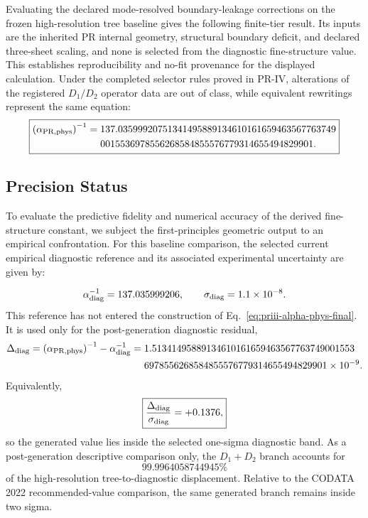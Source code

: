 \documentclass[11pt]{article}
\begin{document}
Evaluating the declared mode-resolved boundary-leakage corrections on the
frozen high-resolution tree baseline gives the following finite-tier result. Its inputs are the inherited PR internal geometry, structural boundary deficit, and declared three-sheet scaling, and none is selected from the diagnostic fine-structure value.  This establishes reproducibility and no-fit provenance for the displayed calculation.  Under the completed selector rules proved in PR-IV, alterations of the registered $D_1/D_2$ operator data are out of class, while equivalent rewritings represent the same equation:
\begin{equation}
\boxed{
\begin{split}
\left(\alpha_{\rm PR,phys}\right)^{-1} = {} & 137.03599920751341495889134610161659463567763749 \\
& 0015536978556268584855576779314655494829901.
\label{eq:priii-alpha-phys-final}
\end{split}}
\end{equation}

\subsection{Precision Status}
\label{subsec:priii-alpha-precision-status}
To evaluate the predictive fidelity and numerical accuracy of the derived fine-structure constant, we subject the first-principles geometric output to an empirical confrontation. For this baseline comparison, the selected current empirical diagnostic reference and its associated experimental uncertainty are given by:

\begin{equation}
\alpha_{\rm diag}^{-1}=137.035999206,
\qquad
\sigma_{\rm diag}=1.1\times 10^{-8}.
\end{equation}
This reference has not entered the construction of Eq.~\eqref{eq:priii-alpha-phys-final}.  It is used only for the post-generation diagnostic residual,
\begin{equation}
\begin{split}
\Delta_{\rm diag}
=
\left(\alpha_{\rm PR,phys}\right)^{-1}
-
\alpha_{\rm diag}^{-1}
= {} &
1.51341495889134610161659463567763749001553 \\
& 6978556268584855576779314655494829901\times 10^{-9}.
\end{split}
\end{equation}
Equivalently,
\begin{equation}
\boxed{
\frac{\Delta_{\rm diag}}{\sigma_{\rm diag}}
=
+0.1376 ,}
\end{equation}
so the generated value lies inside the selected one-sigma diagnostic band. As a post-generation descriptive comparison only, the $D_1+D_2$ branch accounts for
\begin{equation}
\boxed{
99.9964058744945\%}
\end{equation}
of the high-resolution tree-to-diagnostic displacement.  Relative to the CODATA 2022 \cite{codata2022} recommended-value comparison, the same generated branch remains inside two sigma.
\end{document}
